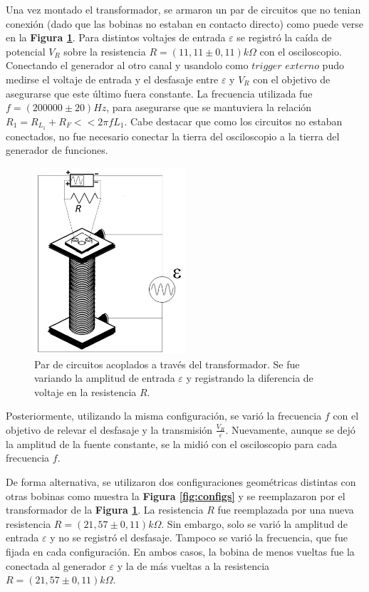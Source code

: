 \documentclass[11pt,a4paper]{article}
\begin{document}
Una vez montado el transformador, se armaron un par de circuitos que no tenian conexión (dado que las bobinas no estaban en contacto directo) como puede verse en la \textbf{Figura \ref{fig:trans1_circ}}. Para distintos voltajes de entrada $\varepsilon$ se registró la caída de potencial $V_R$ sobre la resistencia $R = (11,11 \pm 0,11)k\Omega$ con el osciloscopio. Conectando el generador al otro canal y usandolo como $trigger$ $externo$ pudo medirse el voltaje de entrada y el desfasaje entre $\varepsilon$ y $V_R$ con el objetivo de asegurarse que este último fuera constante. La frecuencia utilizada fue $f = (200000 \pm 20)Hz$, para asegurarse que se mantuviera la relación $R_1 = R_{L_1}+R_F << 2\pi fL_1$. Cabe destacar que como los circuitos no estaban conectados, no fue necesario conectar la tierra del osciloscopio a la tierra del generador de funciones. 


\begin{figure}[h!]
\centering
   \includegraphics[width=0.5\textwidth]{Transformadores1_circuito}
   \caption{Par de circuitos acoplados a través del transformador. Se fue variando la amplitud de entrada $\varepsilon$ y registrando la diferencia de voltaje en la resistencia $R$.}  
   \label{fig:trans1_circ}
\end{figure}

Posteriormente, utilizando la misma configuración, se varió la frecuencia $f$ con el objetivo de relevar el desfasaje y la transmisión $\frac{V_R}{\varepsilon}$. Nuevamente, aunque se dejó la amplitud de la fuente constante, se la midió con el osciloscopio para cada frecuencia $f$.

De forma alternativa, se utilizaron dos configuraciones geométricas distintas con otras bobinas como muestra la \textbf{Figura \ref{fig:configs}} y se reemplazaron por el transformador de la \textbf{Figura \ref{fig:trans1_circ}}. La resistencia $R$ fue reemplazada por una nueva resistencia $R = (21,57 \pm 0,11)k\Omega$. Sin embargo, solo se varió la amplitud de entrada $\varepsilon$ y no se registró el desfasaje. Tampoco se varió la frecuencia, que fue fijada en cada configuración. En ambos casos, la bobina de menos vueltas fue la conectada al generador $\varepsilon$ y la de más vueltas a la resistencia $R = (21,57 \pm 0,11)k\Omega$.
\end{document}
